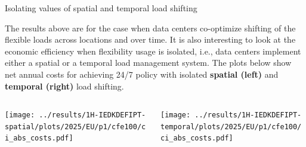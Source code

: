 \begin{frame}{Isolating values of spatial and temporal load shifting}
\label{isolated-hook}

  {\footnotesize
  The results above are for the case when data centers \alert{co-optimize} shifting of the flexible loads across locations and over time. It is also interesting to look at the economic efficiency when flexibility usage is isolated, i.e., data centers implement either a spatial or a temporal load management system. The plots below show net annual costs for achieving 24/7 policy with isolated {\bf spatial (left)} and {\bf temporal (right)} load shifting.

  \vspace{0.4cm} 
  \begin{columns}
    \begin{column}{7cm}
    \texttt{[image: ../results/1H-IEDKDEFIPT-spatial/plots/2025/EU/p1/cfe100/ci\_abs\_costs.pdf]}
    \end{column}
    
    \begin{column}{7cm}
    \texttt{[image: ../results/1H-IEDKDEFIPT-temporal/plots/2025/EU/p1/cfe100/ci\_abs\_costs.pdf]}
    \end{column}
  \end{columns}

  }
  
\end{frame}


